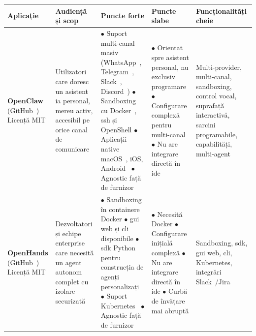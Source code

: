 \documentclass[12pt, a4paper, oneside, romanian]{teza-upb}
\begin{document}
  \begin{table}[H]
  \centering
  \scriptsize
  \setlength{\tabcolsep}{4pt}
  \renewcommand{\arraystretch}{1.5}
  \vspace{2mm}
    \begin{tabularx}{\textwidth}{@{} >{\hsize=0.5\hsize\RaggedRight}X >{\hsize=0.7\hsize\RaggedRight}X >{\hsize=1.1\hsize\RaggedRight}X >{\hsize=1.1\hsize\RaggedRight}X >{\hsize=0.6\hsize\RaggedRight}X @{}}
      \toprule
      \textbf{Aplicație} & \textbf{Audiență și scop} & \textbf{Puncte forte} & \textbf{Puncte slabe} & \textbf{Funcționalități cheie} \\
      \midrule

      \textbf{OpenClaw} \newline (GitHub~\cite{gh_openclaw}) \newline Licență MIT &
      Utilizatori care doresc un asistent \ac{ia} personal, mereu activ, accesibil pe orice canal de comunicare &
      $\bullet$ Suport multi-canal masiv (WhatsApp~\cite{web_whatsapp}, Telegram~\cite{web_telegram}, Slack~\cite{web_slack}, Discord~\cite{web_discord})\newline
      $\bullet$ Sandboxing cu Docker~\cite{web_docker}, \ac{ssh} și OpenShell\newline
      $\bullet$ Aplicații native macOS~\cite{web_macos}, iOS, Android~\cite{web_android}\newline
      $\bullet$ Agnostic față de furnizor &
      $\bullet$ Orientat spre asistent personal, nu exclusiv programare\newline
      $\bullet$ Configurare complexă pentru multi-canal\newline
      $\bullet$ Nu are integrare directă în \ac{ide} &
      Multi-provider, multi-canal, sandboxing, control vocal, suprafață interactivă, sarcini programabile, capabilități, multi-agent \\
      \midrule

      \textbf{OpenHands} \newline (GitHub~\cite{gh_openhands}) \newline Licență MIT &
      Dezvoltatori și echipe enterprise care necesită un agent autonom complet cu izolare securizată &
      $\bullet$ Sandboxing în containere Docker\newline
      $\bullet$ \ac{gui} web și \ac{cli} disponibile\newline
      $\bullet$ \ac{sdk} Python pentru construcția de agenți personalizați\newline
      $\bullet$ Suport Kubernetes~\cite{web_kubernetes}\newline
      $\bullet$ Agnostic față de furnizor &
      $\bullet$ Necesită Docker\newline
      $\bullet$ Configurare inițială complexă\newline
      $\bullet$ Nu are integrare directă în \ac{ide}\newline
      $\bullet$ Curbă de învățare mai abruptă &
      Sandboxing, \ac{sdk}, \ac{gui} web, \ac{cli}, Kubernetes, integrări Slack~\cite{web_slack}/Jira~\cite{web_jira} \\
      \midrule


\end{tabularx}
\end{table}
\end{document}
